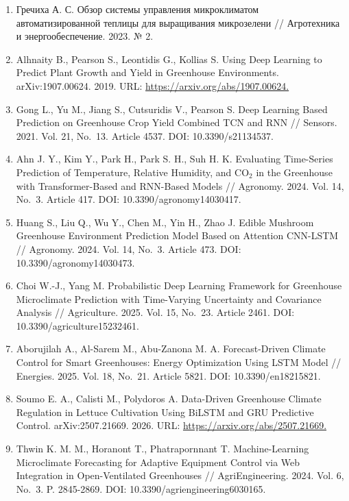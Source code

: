 \documentclass[a4paper,14pt]{extarticle}
\begin{document}
\begin{enumerate}
  хозяйством на базе микроконтроллеров: выпускная квалификационная
  работа. Екатеринбург: Уральский государственный педагогический
  университет, 2021.
\item
  Гречиха А. С. Обзор системы управления микроклиматом
  автоматизированной теплицы для выращивания микрозелени // Агротехника
  и энергообеспечение. 2023. № 2.
\item
  Alhnaity B., Pearson S., Leontidis G., Kollias S. Using Deep Learning
  to Predict Plant Growth and Yield in Greenhouse Environments.
  arXiv:1907.00624. 2019. URL: \url{https://arxiv.org/abs/1907.00624.}
\item
  Gong L., Yu M., Jiang S., Cutsuridis V., Pearson S. Deep Learning
  Based Prediction on Greenhouse Crop Yield Combined TCN and RNN //
  Sensors. 2021. Vol. 21, No.~13. Article 4537. DOI: 10.3390/s21134537.
\item
  Ahn J. Y., Kim Y., Park H., Park S. H., Suh H. K. Evaluating
  Time-Series Prediction of Temperature, Relative Humidity, and CO\(_2\)
  in the Greenhouse with Transformer-Based and RNN-Based Models //
  Agronomy. 2024. Vol. 14, No.~3. Article 417. DOI:
  10.3390/agronomy14030417.
\item
  Huang S., Liu Q., Wu Y., Chen M., Yin H., Zhao J. Edible Mushroom
  Greenhouse Environment Prediction Model Based on Attention CNN-LSTM //
  Agronomy. 2024. Vol. 14, No.~3. Article 473. DOI:
  10.3390/agronomy14030473.
\item
  Choi W.-J., Yang M. Probabilistic Deep Learning Framework for
  Greenhouse Microclimate Prediction with Time-Varying Uncertainty and
  Covariance Analysis // Agriculture. 2025. Vol. 15, No.~23. Article
  2461. DOI: 10.3390/agriculture15232461.
\item
  Aborujilah A., Al-Sarem M., Abu-Zanona M. A. Forecast-Driven Climate
  Control for Smart Greenhouses: Energy Optimization Using LSTM Model //
  Energies. 2025. Vol. 18, No.~21. Article 5821. DOI:
  10.3390/en18215821.
\item
  Soumo E. A., Calisti M., Polydoros A. Data-Driven Greenhouse Climate
  Regulation in Lettuce Cultivation Using BiLSTM and GRU Predictive
  Control. arXiv:2507.21669. 2026. URL:
  \url{https://arxiv.org/abs/2507.21669.}
\item
  Thwin K. M. M., Horanont T., Phatrapornnant T. Machine-Learning
  Microclimate Forecasting for Adaptive Equipment Control via Web
  Integration in Open-Ventilated Greenhouses // AgriEngineering. 2024.
  Vol. 6, No.~3. P. 2845-2869. DOI: 10.3390/agriengineering6030165.

\end{enumerate}
\end{document}

